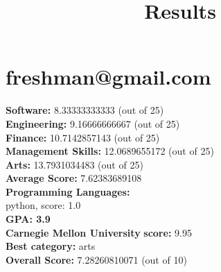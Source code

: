 \documentclass{article}
\title{Results}
\begin{document}
\section{freshman@gmail.com}
\textbf{Software:} 8.33333333333 (out of 25)\\
\textbf{Engineering: } 9.16666666667 (out of 25)\\
\textbf{Finance:} 10.7142857143 (out of 25)\\
\textbf{Management Skills:} 12.0689655172 (out of 25)\\
\textbf{Arts:} 13.7931034483 (out of 25)\\
\textbf{Average Score: } 7.62383689108\\
\textbf{Programming Languages:} \\
python, score: 1.0\\
\textbf{GPA: 3.9}\\
\textbf{Carnegie Mellon University} \textbf{score:} 9.95\\
\textbf{Best category: } arts\\
\textbf{Overall Score: }7.28260810071 (out of 10)
\end{document}
